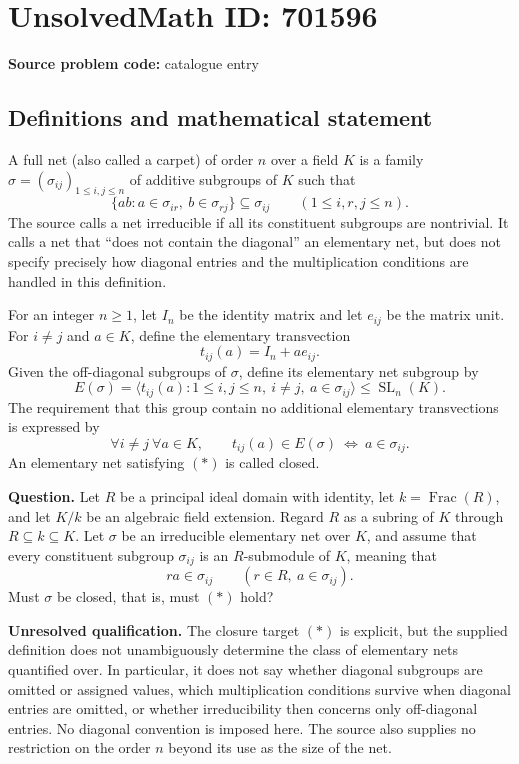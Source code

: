 \documentclass[11pt]{article}
\begin{document}
\section*{UnsolvedMath ID: 701596}
\textbf{Source problem code:} catalogue entry
\subsection{Definitions and mathematical statement}
A full net (also called a carpet) of order \(n\) over a field \(K\) is a family \(\sigma=(\sigma_{ij})_{1\leq i,j\leq n}\) of additive subgroups of \(K\) such that
\[
\{ab:a\in\sigma_{ir},\ b\in\sigma_{rj}\}\subseteq\sigma_{ij}
\qquad(1\leq i,r,j\leq n).
\]
The source calls a net irreducible if all its constituent subgroups are nontrivial. It calls a net that ``does not contain the diagonal'' an elementary net, but does not specify precisely how diagonal entries and the multiplication conditions are handled in this definition.

For an integer \(n\geq1\), let \(I_n\) be the identity matrix and let \(e_{ij}\) be the matrix unit. For \(i\ne j\) and \(a\in K\), define the elementary transvection
\[
t_{ij}(a)=I_n+a e_{ij}.
\]
Given the off-diagonal subgroups of \(\sigma\), define its elementary net subgroup by
\[
E(\sigma)=\bigl\langle t_{ij}(a):1\leq i,j\leq n,\ i\ne j,\ a\in\sigma_{ij}\bigr\rangle
\leq\operatorname{SL}_n(K).
\]
The requirement that this group contain no additional elementary transvections is expressed by
\[
\forall i\ne j\ \forall a\in K,\qquad
 t_{ij}(a)\in E(\sigma)\ \Longleftrightarrow\ a\in\sigma_{ij}.
\tag{*}
\]
An elementary net satisfying \((*)\) is called closed.

\textbf{Question.} Let \(R\) be a principal ideal domain with identity, let \(k=\operatorname{Frac}(R)\), and let \(K/k\) be an algebraic field extension. Regard \(R\) as a subring of \(K\) through \(R\subseteq k\subseteq K\). Let \(\sigma\) be an irreducible elementary net over \(K\), and assume that every constituent subgroup \(\sigma_{ij}\) is an \(R\)-submodule of \(K\), meaning that
\[
r a\in\sigma_{ij}\qquad(r\in R,\ a\in\sigma_{ij}).
\]
Must \(\sigma\) be closed, that is, must \((*)\) hold?

\textbf{Unresolved qualification.} The closure target \((*)\) is explicit, but the supplied definition does not unambiguously determine the class of elementary nets quantified over. In particular, it does not say whether diagonal subgroups are omitted or assigned values, which multiplication conditions survive when diagonal entries are omitted, or whether irreducibility then concerns only off-diagonal entries. No diagonal convention is imposed here. The source also supplies no restriction on the order \(n\) beyond its use as the size of the net.
\end{document}
